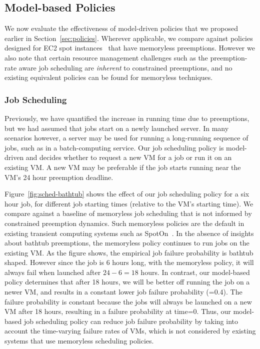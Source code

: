 \documentclass[sigconf]{acmart} %
\newcommand{\subsecspace}[0]{-0.20cm}
\begin{document}
\vspace*{\subsecspace}
\subsection{Model-based Policies}
\label{subsec:eval-policy}

We now evaluate the effectiveness of model-driven policies that we proposed earlier in Section~\ref{sec:policies}.
Wherever applicable, we compare against policies designed for EC2 spot instances~\cite{harlap2018tributary, spoton} that have memoryless preemptions. 
However we also note that certain resource management challenges such as the preemption-rate aware job scheduling are \emph{inherent} to constrained preemptions, and no existing equivalent policies can be found for memoryless techniques. 

\vspace*{\subsecspace}
\subsubsection{Job Scheduling}

Previously, we have quantified the increase in running time due to preemptions, but we had assumed that jobs start on a newly launched server.
In many scenarios however, a server may be used for running a long-running sequence of jobs, such as in a batch-computing service. 
Our job scheduling policy is model-driven and decides whether to request a new VM for a job or run it on an existing VM.
A new VM may be preferable if the job starts running near the VM's 24 hour preemption deadline.

Figure~\ref{fig:sched-bathtub} shows the effect of our job scheduling policy for a six hour job, for different job starting times (relative to the VM's starting time). 
We compare against a baseline of memoryless job scheduling that is not informed by constrained preemption dynamics.
Such memoryless policies are the default in existing transient computing systems such as SpotOn~\cite{spoton}. 
In the absence of insights about bathtub preemptions, the memoryless policy continues to run jobs on the existing VM. 
As the figure shows, the empirical job failure probability is bathtub shaped. 
However since the job is 6 hours long, with the memoryless policy, it will always fail when launched after $24-6=18$ hours.
In contrast, our model-based policy determines that after 18 hours, we will be better off running the job on a newer VM, and results in a constant lower job failure probability (=0.4). The failure probability is constant because the jobs will always be launched on a new VM after 18 hours, resulting in a failure probability at time=0. 
Thus, our model-based job scheduling policy can reduce job failure probability by taking into account the time-varying failure rates of VMs, which is not considered by existing systems that use memoryless scheduling policies. 
\end{document}
